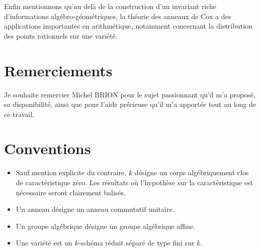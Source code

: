Enfin mentionnons qu'au delà de la construction d'un invariant riche d'informations algébro-géométriques, la théorie des anneaux de Cox a des applications importantes en arithmétique, notamment concernant la distribution des points rationnels sur une variété.



\section*{Remerciements}

Je souhaite remercier Michel BRION pour le sujet passionnant qu'il m'a proposé, sa disponibilité, ainsi que pour l'aide précieuse qu'il m'a apportée tout au long de ce travail.

\section*{Conventions}
\label{conventions}

\begin{itemize}
\item Sauf mention explicite du contraire, $k$ désigne un corps algébriquement clos de caractéristique zéro. Les résultats où l'hypothèse sur la caractéristique est nécessaire seront clairement balisés.
\item Un anneau désigne un anneau commutatif unitaire.
\item Un groupe algébrique désigne un groupe algébrique affine.
\item Une variété est un $k$-schéma réduit séparé de type fini sur $k$.
\end{itemize}


